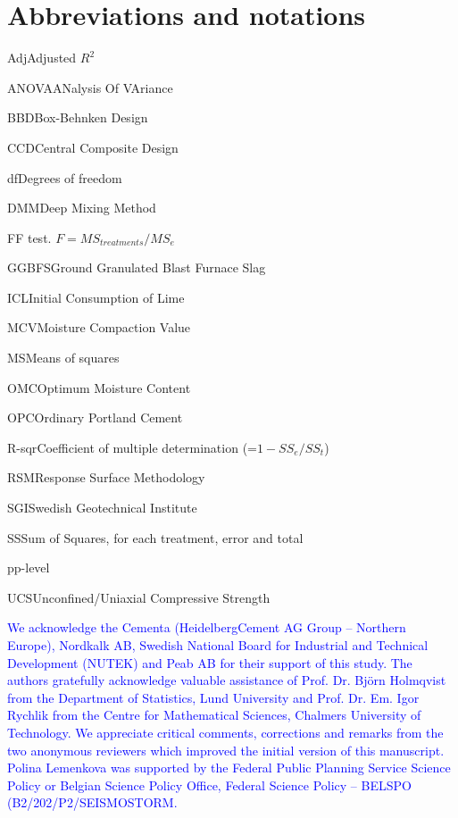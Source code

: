 \documentclass[eprint,
]{actapoly}
\begin{document}
\section{Abbreviations and notations}\label{symb}
\begin{nomenclature}
\item{Adj}{Adjusted $R^2$}
\item{ANOVA}{ANalysis Of VAriance}
\item{BBD}{Box-Behnken Design}
\item{CCD}{Central Composite Design}
\item{df}{Degrees of freedom}
\item{DMM}{Deep Mixing Method}
\item{F}{F test. $F=MS_{treatments}/MS_{e}$}
\item{GGBFS}{Ground Granulated Blast Furnace Slag}
\item{ICL}{Initial Consumption of Lime}
\item{MCV}{Moisture Compaction Value}
\item{MS}{Means of squares}
\item{OMC}{Optimum Moisture Content}
\item{OPC}{Ordinary Portland Cement}
\item{R-sqr}{Coefficient of multiple determination (=$1-SS_{e}/SS_{t}$)}
\item{RSM}{Response Surface Methodology}
\item{SGI}{Swedish Geotechnical Institute}
\item{SS}{Sum of Squares, for each treatment, error and total}
\item{p}{p-level}
\item{UCS}{Unconfined/Uniaxial Compressive Strength}
\end{nomenclature}

\begin{acknowledgements}
\textcolor{blue}{We acknowledge the Cementa (HeidelbergCement AG Group -- Northern Europe), Nordkalk AB, Swedish National Board for Industrial and Technical Development (NUTEK) and Peab AB for their support of this study. The authors gratefully acknowledge  valuable assistance of Prof. Dr. Björn Holmqvist from the Department of Statistics, Lund University and Prof. Dr. Em. Igor Rychlik from the Centre for Mathematical Sciences, Chalmers University of Technology. We appreciate critical comments, corrections and remarks from the two anonymous reviewers which improved the initial version of this manuscript. Polina Lemenkova was supported by the Federal Public Planning Service Science Policy or Belgian Science Policy Office, Federal Science Policy -- BELSPO (B2/202/P2/SEISMOSTORM.}
\end{acknowledgements}




\end{document}
